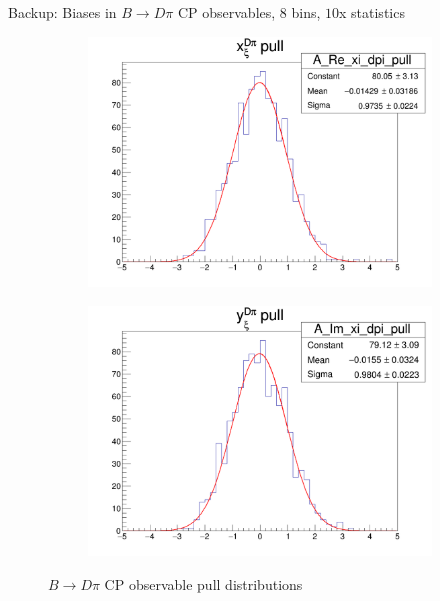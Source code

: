 \documentclass{beamer}
\begin{document}
\begin{frame}{Backup: Biases in $B\to D\pi$ CP observables, $8$ bins, $10$x statistics}
  \begin{figure}
    \centering
    \vspace{-0.2cm}
    \begin{subfigure}{0.5\textwidth}
      \includegraphics[width = 1.0\textwidth]{A_Re_xi_dpi_8Bins_StatsMultiplier10_pull.png}
    \end{subfigure}%
    \begin{subfigure}{0.5\textwidth}
      \includegraphics[width = 1.0\textwidth]{A_Im_xi_dpi_8Bins_StatsMultiplier10_pull.png}
    \end{subfigure}
    \caption{$B\to D\pi$ CP observable pull distributions}
  \end{figure}
\end{frame}
\end{document}
